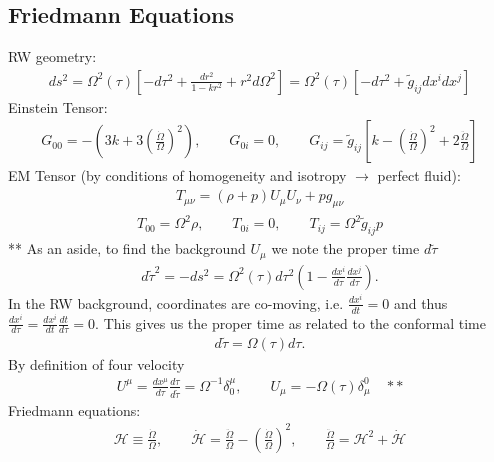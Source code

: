 \documentclass[10pt,letterpaper]{article}
\numberwithin{equation}{section}
\begin{document}
\newpage
\begin{appendices}

\section{Friedmann Equations}
RW geometry:
\begin{eqnarray}
ds^2 = \Omega^2(\tau)\left[ -d\tau^2 + \frac{dr^2}{1-kr^2} + r^2d\Omega^2\right] = \Omega^2(\tau)\left[ -d\tau^2 + \tilde g_{ij} dx^i dx^j\right]
\end{eqnarray}
Einstein Tensor:
\begin{eqnarray}
G_{00} = -\left(3k + 3 \left(\frac{\dot \Omega}{\Omega}\right)^2\right),\qquad G_{0i} = 0,\qquad G_{ij} = \tilde g_{ij} \left[k - \left(\frac{\dot \Omega}{\Omega}\right)^2 + 2\frac{\ddot \Omega}{\Omega}\right]
\end{eqnarray}
EM Tensor (by conditions of homogeneity and isotropy $\to$ perfect fluid):
\begin{eqnarray}
T_{\mu\nu} = (\rho+p)U_\mu U_\nu + p g_{\mu\nu}
\end{eqnarray}
\begin{eqnarray}
T_{00} = \Omega^2\rho,\qquad T_{0i} = 0,\qquad T_{ij} = \Omega^2 \tilde g_{ij} p 
\end{eqnarray}
** As an aside, to find the background $U_\mu$ we note the proper time $d\tilde \tau$
\begin{eqnarray}
d\tilde \tau^2 = -ds^2 =\Omega^2(\tau)d\tau^2\left( 1- \frac{dx^i}{d\tau}\frac{dx^j}{d\tau}\right).
\end{eqnarray}
In the RW background, coordinates are co-moving, i.e. $\frac{dx^i}{dt} =0$ and thus $\frac{dx^i}{d\tau} = \frac{dx^i}{dt}\frac{dt}{d\tau} = 0$. This gives us the proper time as related to the conformal time
\begin{eqnarray}
d\tilde\tau = \Omega (\tau) d\tau.
\end{eqnarray}
By definition of four velocity
\begin{eqnarray}
U^\mu = \frac{dx^\mu}{d\tau}\frac{d\tau}{d\tilde\tau} =  \Omega^{-1}\delta^\mu_0,\qquad U_\mu = -\Omega(\tau) \delta^0_\mu \quad **
\end{eqnarray}
Friedmann equations:
\begin{eqnarray}
 \mathcal H \equiv \frac{\dot \Omega}{\Omega},\qquad \dot{\mathcal H} = \frac{\ddot \Omega}{\Omega} - \left(\frac{\dot \Omega}{\Omega}\right)^2,\qquad \frac{\ddot \Omega}{\Omega} = \mathcal H^2 + \dot{\mathcal H}
\end{eqnarray}

\end{appendices}
\end{document}
